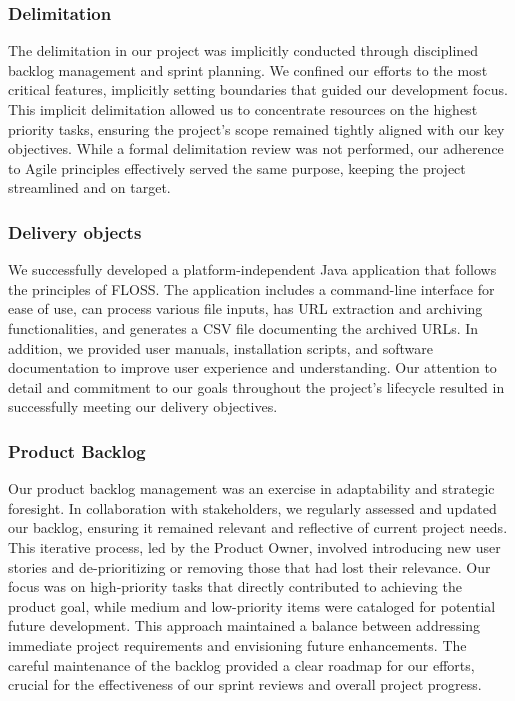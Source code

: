 \subsubsection{Delimitation}
The delimitation in our project was implicitly conducted through disciplined backlog management and sprint planning.
We confined our efforts to the most critical features, implicitly setting boundaries that guided our development focus.
This implicit delimitation allowed us to concentrate resources on the highest priority tasks, ensuring the project’s scope remained tightly aligned with our key objectives.
While a formal delimitation review was not performed, our adherence to Agile principles effectively served the same purpose, keeping the project streamlined and on target.

\subsubsection{Delivery objects}
We successfully developed a platform-independent Java application that follows the principles of FLOSS.
The application includes a command-line interface for ease of use, can process various file inputs, has URL extraction and archiving functionalities, and generates a CSV file documenting the archived URLs.
In addition, we provided user manuals, installation scripts, and software documentation to improve user experience and understanding.
Our attention to detail and commitment to our goals throughout the project's lifecycle resulted in successfully meeting our delivery objectives.

\subsubsection{Product Backlog}
Our product backlog management was an exercise in adaptability and strategic foresight.
In collaboration with stakeholders, we regularly assessed and updated our backlog, ensuring it remained relevant and reflective of current project needs.
This iterative process, led by the Product Owner, involved introducing new user stories and de-prioritizing or removing those that had lost their relevance.
Our focus was on high-priority tasks that directly contributed to achieving the product goal, while medium and low-priority items were cataloged for potential future development.
This approach maintained a balance between addressing immediate project requirements and envisioning future enhancements.
The careful maintenance of the backlog provided a clear roadmap for our efforts, crucial for the effectiveness of our sprint reviews and overall project progress.

